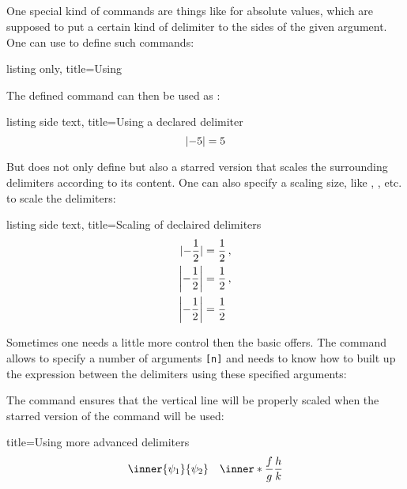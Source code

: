 \documentclass[a4paper, 10pt, headings=standardclasses, oneside, bibliography=totocnumbered]{scrbook}
\begin{document}
\subsection{}

One special kind of commands are things like  for absolute values, which are supposed to put a certain kind of delimiter to the sides of the given argument.
One can use  to define such commands:
\begin{tcblisting}{listing only, title={Using }}
\DeclarePairedDelimiter{\abs}{\lvert}{\rvert}
\end{tcblisting}
The defined command can then be used as :
\begin{tcblisting}{listing side text, title={Using a declared delimiter}}
  \[
    \abs{-5} = 5
  \]
\end{tcblisting}

But  does not only define  but also a starred version  that scales the surrounding delimiters according to its content.
One can also specify a scaling size, like , , etc. to scale the delimiters:
\begin{tcblisting}{listing side text, title={Scaling of declaired delimiters}}
\begin{align*}
  \abs{-\frac{1}{2}}
  &=
  \frac{1}{2} \,,
  \\
  \abs*{-\frac{1}{2}}
  &=
  \frac{1}{2} \,,
  \\
  \abs[\bigg]{-\frac{1}{2}}
  &=
  \frac{1}{2}
\end{align*}
\end{tcblisting}

Sometimes one needs a little more control then the basic  offers.
The command  allows to specify a number of arguments \texttt{[n]} and needs to know how to built up the expression between the delimiters using these specified arguments:
The command  ensures that the vertical line  will be properly scaled when the starred version of the command will be used:
\begin{tcblisting}{title={Using more advanced delimiters}}
\[
  \inner{\psi_1}{\psi_2}
  \quad
  \inner*{\frac{f}{g}}{\frac{h}{k}}
\]
\end{tcblisting}
\end{document}

